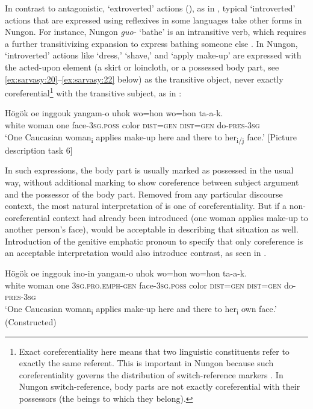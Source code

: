 \documentclass[output=paper,colorlinks,citecolor=brown]{langscibook}
\begin{document}
In contrast to antagonistic, ‘extroverted’ actions (\citealt[61]{KoenigSiemund1999}), as in , typical ‘introverted’ actions that are expressed using reflexives in some languages take other forms in Nungon. For instance, Nungon \textit{guo-} ‘bathe’ is an intransitive verb, which requires a further transitivizing expansion to express bathing someone else \citep[513--516]{Sarvasy2017Grammar}. In Nungon, ‘introverted’ actions like ‘dress,’ ‘shave,’ and ‘apply make-up’ are expressed with the acted-upon element (a skirt or loincloth, or a possessed body part, see \ref{ex:sarvasy:20}--\ref{ex:sarvasy:22} below) as the transitive object, never exactly coreferential\footnote{Exact coreferentiality here means that two linguistic constituents refer to exactly the same referent. This is important in Nungon because such coreferentiality governs the distribution of switch-reference markers \citep{Sarvasy2015Imperative}. In Nungon switch-reference, body parts are not exactly coreferential with their possessors (the beings to which they belong).} with the transitive subject, as in :

\ea%
    \label{ex:sarvasy:15}
    \gll    Högök    oe  inggouk  yangam-o  uhok wo=hon  wo=hon  ta-a-k.\\
            white    woman  one    face-\textsc{3sg.poss}  color \textsc{dist=gen}  \textsc{dist=gen} do-\textsc{pres-3sg}\\
    \glt    ‘One Caucasian woman\textsubscript{i} applies make-up here and there to her\textsubscript{i/j} face.’ [Picture description task 6]
\z

In such expressions, the body part is usually marked as possessed in the usual way, without additional marking to show coreference between subject argument and the possessor of the body part. Removed from any particular discourse context, the most natural interpretation of  is one of coreferentiality. But if a non-coreferential context had already been introduced (one woman applies make-up to another person’s face),  would be acceptable in describing that situation as well. Introduction of the genitive emphatic pronoun to specify that only coreference is an acceptable interpretation would also introduce contrast, as seen in .

\ea%
    \label{ex:sarvasy:16}
    \gll    Högök    oe  inggouk  ino-in      yangam-o  uhok  wo=hon  wo=hon  ta-a-k.\\
            white    woman  one    \textsc{3sg.pro.emph-gen}  face-\textsc{3sg.poss}  color \textsc{dist=gen}  \textsc{dist=gen}  do-\textsc{pres-3sg}\\
    \glt    ‘One Caucasian woman\textsubscript{i} applies make-up here and there to her\textsubscript{i} own face.’ (Constructed)
\z
\end{document}

